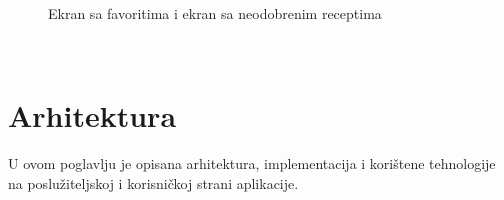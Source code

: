 \documentclass[times, utf8, zavrsni]{fer}
\begin{document}
\begin{figure}[h]
      \centering
      \caption{Ekran sa favoritima i ekran sa neodobrenim receptima}
      \label{fig:special}
\end{figure}\\


\chapter{Arhitektura}
U ovom poglavlju je opisana arhitektura, implementacija
i korištene tehnologije na poslužiteljskoj i korisničkoj strani aplikacije.
\end{document}
